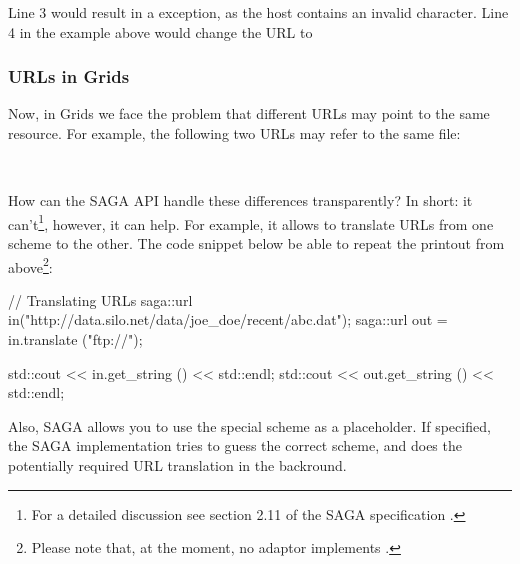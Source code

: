   Line 3 would result in a  exception, as the
  host contains an invalid character.  Line 4 in the example above would
  change the URL to

   \shift {}




 \subsubsection{URLs in Grids}

  Now, in Grids we face the problem that different URLs may
  point to the same resource. For example, the following two URLs
  may refer to the same file:

   \shift {}\\
   \shift {}

  How can the SAGA API handle these differences transparently?
  In short: it can't\footnote{For a detailed discussion see
  section 2.11 of the SAGA specification \cite{ogf-gfd-90}.}, however, it  can help.  For example, it allows to translate URLs
  from one scheme to the other.  The code snippet below 
  be able to repeat the printout from above\footnote{Please note that,
  at the moment, no adaptor implements .}:

  \begin{mycode}
  // Translating URLs
  saga::url in("http://data.silo.net/data/joe_doe/recent/abc.dat");
  saga::url out = in.translate ("ftp://");

  std::cout <<  in.get_string () << std::endl;
  std::cout << out.get_string () << std::endl;
  \end{mycode}

  Also, SAGA allows you to use the special scheme  as
  a placeholder.  If specified, the SAGA implementation tries to
  guess the correct scheme, and does the potentially required
  URL translation in the backround.



